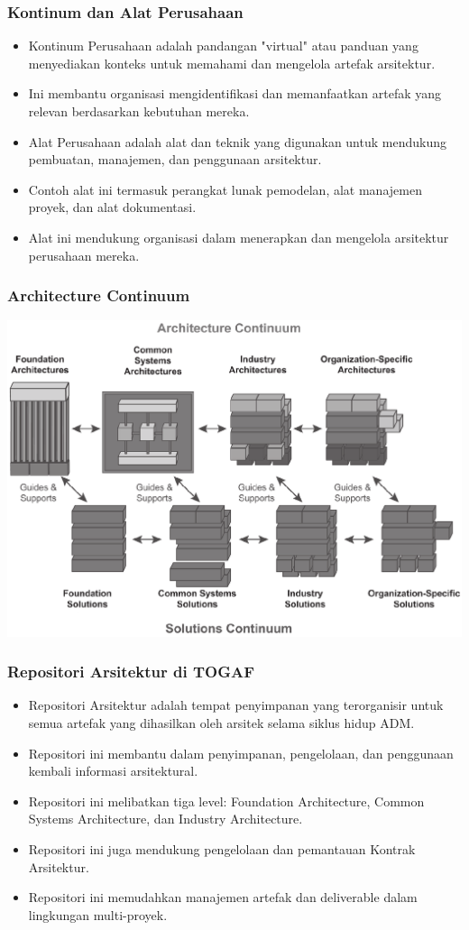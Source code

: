 \documentclass[aspectratio=169]{beamer}
\begin{document}
	\begin{frame}
		\frametitle{Kontinum dan Alat Perusahaan}
		\begin{itemize}
			\item Kontinum Perusahaan adalah pandangan "virtual" atau panduan yang menyediakan konteks untuk memahami dan mengelola artefak arsitektur.
			\item Ini membantu organisasi mengidentifikasi dan memanfaatkan artefak yang relevan berdasarkan kebutuhan mereka.
			\item Alat Perusahaan adalah alat dan teknik yang digunakan untuk mendukung pembuatan, manajemen, dan penggunaan arsitektur.
			\item Contoh alat ini termasuk perangkat lunak pemodelan, alat manajemen proyek, dan alat dokumentasi.
			\item Alat ini mendukung organisasi dalam menerapkan dan mengelola arsitektur perusahaan mereka.
		\end{itemize}
	\end{frame}
	
	{
		\begin{frame}
			\frametitle{Architecture Continuum}
			\begin{center}
				\includegraphics[width=.80\textwidth]{../figures/enterprise_continuum}
			\end{center}
		\end{frame}
	}
	
	\begin{frame}
		\frametitle{Repositori Arsitektur di TOGAF}
		\begin{itemize}
			\item Repositori Arsitektur adalah tempat penyimpanan yang terorganisir untuk semua artefak yang dihasilkan oleh arsitek selama siklus hidup ADM.
			\item Repositori ini membantu dalam penyimpanan, pengelolaan, dan penggunaan kembali informasi arsitektural.
			\item Repositori ini melibatkan tiga level: Foundation Architecture, Common Systems Architecture, dan Industry Architecture.
			\item Repositori ini juga mendukung pengelolaan dan pemantauan Kontrak Arsitektur.
			\item Repositori ini memudahkan manajemen artefak dan deliverable dalam lingkungan multi-proyek.
		\end{itemize}
	\end{frame}
	
\end{document}
